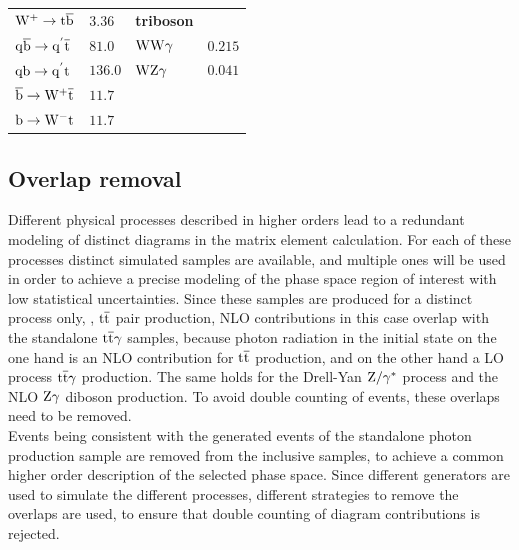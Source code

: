 \begin{table}[tbp]
\begin{tabular}[width=\textwidth]{ll|ll}
  $\mathrm{W^+}\to\mathrm{t}\overline{\mathrm{b}}$                             & $3.36$                               & \textbf{triboson}                            &                                      \\
  $\mathrm{q}\overline{\mathrm{b}}\to\mathrm{q}^{'}\overline{\mathrm{t}}$                    & $81.0$                               & $\mathrm{W}\mathrm{W}\gamma$                                 & $0.215$                              \\
  $\mathrm{q}\mathrm{b}\to\mathrm{q}^{'}\mathrm{t}$                      & $136.0$                              & $\mathrm{W}\mathrm{Z}\gamma$                                 & $0.041$                              \\
  $\overline{\mathrm{b}}\to\mathrm{W^+}\overline{\mathrm{t}}$                            & $11.7$                               &                                              &                                      \\
  $\mathrm{b}\to\mathrm{W^-}\mathrm{t}$                              & $11.7$                               &                                              &                                      \\
  \hline
 \end{tabular}
 \vspace{\baselineskip}
\end{table}

\subsection*{Overlap removal}\label{sec:overlap}

Different physical processes described in higher orders lead to a redundant modeling of distinct diagrams in the matrix element calculation. For each of these processes distinct simulated samples are available, and multiple ones will be used in order to achieve a precise modeling of the phase space region of interest with low statistical uncertainties. Since these samples are produced for a distinct process only, \eg, ${\mathrm{t}\overline{\mathrm{t}}}$ pair production, NLO contributions in this case overlap with the standalone ${\mathrm{t}\overline{\mathrm{t}}}\gamma$ samples, because photon radiation in the initial state on the one hand is an NLO contribution for ${\mathrm{t}\overline{\mathrm{t}}}$ production, and on the other hand a LO process ${\mathrm{t}\overline{\mathrm{t}}}\gamma$ production. The same holds for the Drell-Yan $\mathrm{Z}/\gamma^{*}$ process and the NLO $\mathrm{Z}\gamma$ diboson production. To avoid double counting of events, these overlaps need to be removed.\\
Events being consistent with the generated events of the standalone photon production sample are removed from the inclusive samples, to achieve a common higher order description of the selected phase space. Since different generators are used to simulate the different processes, different strategies to remove the overlaps are used, to ensure that double counting of diagram contributions is rejected.


